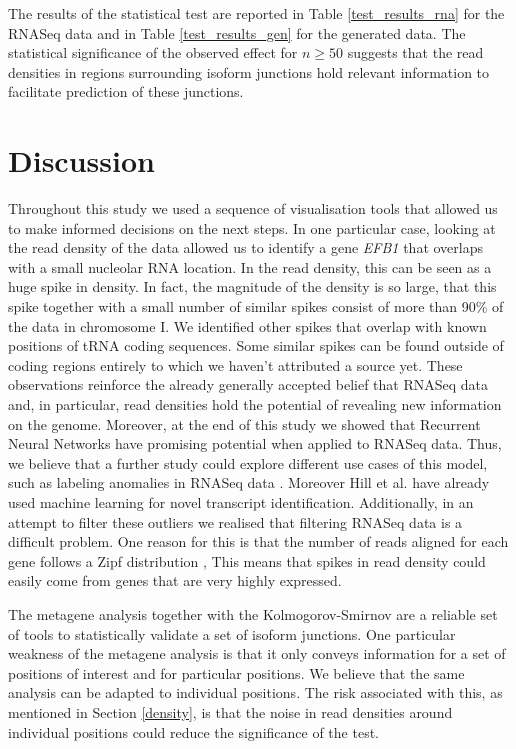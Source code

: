 \documentclass[12pt]{article}
\begin{document}
The results of the statistical test are reported in Table \ref{test_results_rna} for the RNASeq data and in Table \ref{test_results_gen} for the generated data. The statistical significance of the observed effect for $n \ge 50$ suggests that the read densities in regions surrounding isoform junctions hold relevant information to facilitate prediction 
of these junctions. 

\section{Discussion}\label{disc}
Throughout this study we used a sequence of visualisation tools that allowed us to make informed decisions on the next steps. In one particular case, looking at the read density of the data allowed us to identify a gene \textit{EFB1} that overlaps with a small nucleolar RNA location. In the read density, this can be seen as a huge spike in density. In fact, the magnitude of the density is so large, that this spike together with a small number of similar spikes consist of more than 90\% of the data in chromosome I. We identified other spikes that overlap with known positions of tRNA coding sequences. Some similar spikes can be found outside of coding regions entirely to which we haven't attributed a source yet. These observations reinforce the already generally accepted belief that RNASeq data and, in particular, read densities hold the potential of revealing new information on the genome. Moreover, at the end of this study we showed that Recurrent Neural Networks have promising potential when applied to RNASeq data. Thus, we believe that a further study could explore different use cases of this model, such as labeling anomalies in RNASeq data \cite{Zhang2017}. Moreover Hill et al. \cite{Hill2018} have already used machine learning for novel transcript identification. Additionally, in an attempt to filter these outliers we realised that filtering RNASeq data is a difficult problem. One reason for this is that the number of reads aligned for each gene follows a Zipf distribution \cite{PhysRevLett.90.088102}, This means that spikes in read density could easily come from genes that are very highly expressed. 
 

The metagene analysis together with the Kolmogorov-Smirnov are a reliable set of tools to statistically validate a set of isoform junctions. One particular weakness of the metagene analysis is that it only conveys information for a set of positions of interest and for particular positions. We believe that the same analysis can be adapted to individual positions. The risk associated with this, as mentioned in Section \ref{density}, is that the noise in read densities around individual positions could reduce the significance of the test.  
\end{document}
